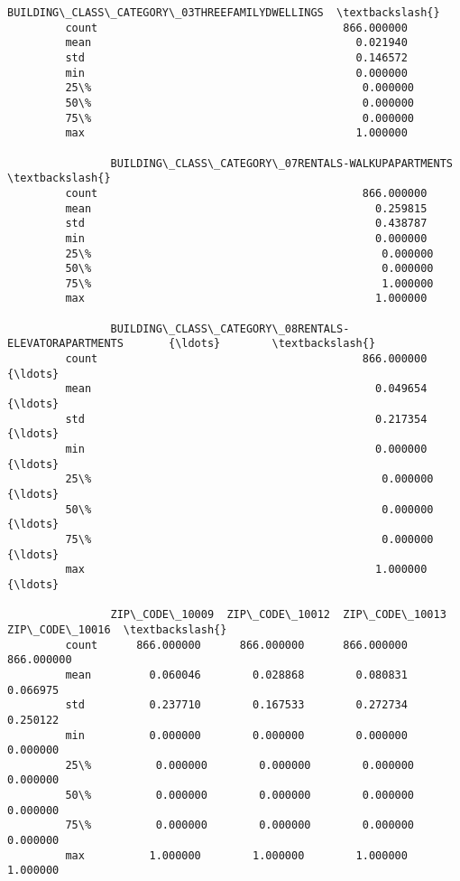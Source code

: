 \documentclass[11pt]{article}
\begin{document}
\begin{Verbatim}[commandchars=\\\{\}]
                BUILDING\_CLASS\_CATEGORY\_03THREEFAMILYDWELLINGS  \textbackslash{}
         count                                      866.000000   
         mean                                         0.021940   
         std                                          0.146572   
         min                                          0.000000   
         25\%                                          0.000000   
         50\%                                          0.000000   
         75\%                                          0.000000   
         max                                          1.000000   
         
                BUILDING\_CLASS\_CATEGORY\_07RENTALS-WALKUPAPARTMENTS  \textbackslash{}
         count                                         866.000000    
         mean                                            0.259815    
         std                                             0.438787    
         min                                             0.000000    
         25\%                                             0.000000    
         50\%                                             0.000000    
         75\%                                             1.000000    
         max                                             1.000000    
         
                BUILDING\_CLASS\_CATEGORY\_08RENTALS-ELEVATORAPARTMENTS       {\ldots}        \textbackslash{}
         count                                         866.000000          {\ldots}         
         mean                                            0.049654          {\ldots}         
         std                                             0.217354          {\ldots}         
         min                                             0.000000          {\ldots}         
         25\%                                             0.000000          {\ldots}         
         50\%                                             0.000000          {\ldots}         
         75\%                                             0.000000          {\ldots}         
         max                                             1.000000          {\ldots}         
         
                ZIP\_CODE\_10009  ZIP\_CODE\_10012  ZIP\_CODE\_10013  ZIP\_CODE\_10016  \textbackslash{}
         count      866.000000      866.000000      866.000000      866.000000   
         mean         0.060046        0.028868        0.080831        0.066975   
         std          0.237710        0.167533        0.272734        0.250122   
         min          0.000000        0.000000        0.000000        0.000000   
         25\%          0.000000        0.000000        0.000000        0.000000   
         50\%          0.000000        0.000000        0.000000        0.000000   
         75\%          0.000000        0.000000        0.000000        0.000000   
         max          1.000000        1.000000        1.000000        1.000000   
         

\end{Verbatim}
\end{document}
